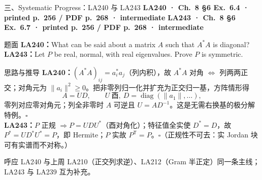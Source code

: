 \documentclass[aspectratio=169,10pt,fontset=none]{ctexbeamer}
\newcommand{\ex}[1]{\textcolor{accent}{\footnotesize\bfseries #1}}
\begin{document}
\begin{frame}[t]{三、Systematic Progress：LA240 与 LA243}
  \leavevmode\ex{LA240 · Ch.~8 §6 Ex.~6.4 · printed p.~256 / PDF p.~268 · intermediate}\quad
  \ex{LA243 · Ch.~8 §6 Ex.~6.7 · printed p.~256 / PDF p.~268 · intermediate}
  \begin{block}{\footnotesize 题面}
    \scriptsize \textbf{LA240：}What can be said about a matrix $A$ such that $A^*A$ is diagonal?\\
    \textbf{LA243：}Let $P$ be real, normal, with real eigenvalues. Prove $P$ is symmetric.
  \end{block}
  \begin{exampleblock}{\footnotesize 思路与推导}
    \scriptsize
    \textbf{LA240：}$(A^*A)_{ij}=a_i^*a_j$（列内积），故 $A^*A$ 对角 $\iff$ 列两两正交；对角元为 $\lVert a_i\rVert^2\ge0$。把非零列归一化并扩充为正交归一基，方阵情形得
    $$A=UD,\qquad U\ \text{酉},\ D=\operatorname{diag}(\lVert a_1\rVert,\ldots),$$
    零列对应零对角元；列全非零时 $A$ 可逆且 $U=AD^{-1}$。这是无需右换基的极分解特例。$\square$\\[2pt]
    \textbf{LA243：}$P$ 正规 $\Rightarrow P=UDU^*$（酉对角化）；特征值全实使 $D^*=D$，故 $P^*=UD^*U^*=P$，即 Hermite；$P$ 实故 $P^{\mathsf T}=P$。$\square$（正规性不可去：实 Jordan 块可有实谱而不对称。）
  \end{exampleblock}
  \begin{block}{\footnotesize 呼应}
    \scriptsize LA240 与上周 LA210（正交列求逆）、LA212（Gram 半正定）同一条主线；LA243 与 LA239 互为补充。
  \end{block}
\end{frame}
\end{document}
